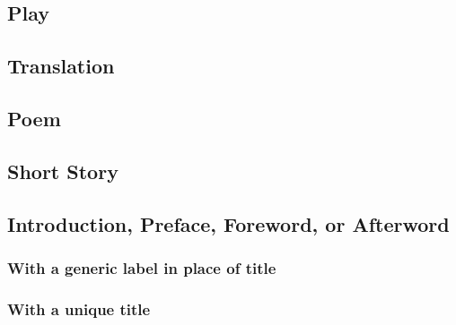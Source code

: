 \documentclass{article}
\begin{document}
\subsection{Play} %
\label{sub:play}
\begin{refsection}
	\nocite{Euripides:1998tx}
	\printbibliography[heading=none]
\end{refsection}
\subsection{Translation} %
\label{sub:translation}
\begin{refsection}
	\nocite{Fagih:2003uj}
	\printbibliography[heading=none]
\end{refsection}
\subsection{Poem} %
\label{sub:poem}
\begin{refsection}
	\nocite{Marvell:1979tp}
	\printbibliography[heading=none]
\end{refsection}
\subsection{Short Story} %
\label{sub:short_story}
\begin{refsection}
	\nocite{Poe:1902wd,Hopi:1986wu}
	\printbibliography[heading=none]
\end{refsection}
\subsection{Introduction, Preface, Foreword, or Afterword} %
\label{sub:introduction_preface_foreword_or_afterword}
\subsubsection{With a generic label in place of title} %
\label{ssub:with_a_generic_label_in_place_of_title}
\begin{refsection}
	\nocite{Felstiner:2001aa,Gere:2021aa}
	\printbibliography[heading=none]
\end{refsection}
\subsubsection{With a unique title} %
\label{ssub:with_a_unique_title}
\begin{refsection}
	\nocite{Seyhan:2008wz}
	\printbibliography[heading=none]
\end{refsection}
\end{document}
